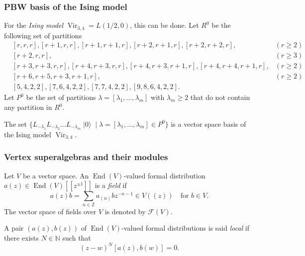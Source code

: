 \documentclass{beamer}
\DeclareMathOperator{\Vir}{Vir}
\DeclareMathOperator{\End}{End}
\DeclareMathOperator{\vac}{|0\rangle}
\begin{document}
\begin{frame}
  \frametitle{PBW basis of the Ising model}

  For the \emph{Ising model} $\Vir_{3, 4} = L(1/2, 0)$, this can be done.
  Let $R^0$ be the following set of partitions
  \footnotesize
  \begin{align*}
    &[r, r, r], [r + 1, r, r], [r + 1, r + 1, r], [r + 2, r + 1, r], [r + 2, r + 2, r], &(r \ge 2) \\
    &[r + 2, r, r], &(r \ge 3) \\
    &[r + 3, r + 3, r, r], [r + 4, r + 3, r, r],  [r + 4, r + 3, r + 1, r], [r + 4, r + 4, r + 1, r], &(r \ge 2) \\
    &[r + 6, r + 5, r + 3, r + 1, r], &(r \ge 2) \\
    &[5, 4, 2, 2], [7, 6, 4, 2, 2], [7, 7, 4, 2, 2], [9, 8, 6, 4, 2, 2].
  \end{align*}
  \normalsize
  Let $P^0$ be the set of partitions $\lambda = [\lambda_1, \dots, \lambda_m]$ with $\lambda_m \ge 2$ that do not contain any partition in $R^0$.

  \begin{theorem}
    \label{thr:2}
    The set $\{L_{-\lambda_1}L_{-\lambda_2}\dots L_{-\lambda_m}\vac \mid \lambda = [\lambda_1, \dots, \lambda_m] \in P^0\}$ is a vector space basis of the Ising model $\Vir_{3, 4}$.
  \end{theorem}

\end{frame}

\begin{frame}
  \frametitle{Vertex superalgebras and their modules}

  Let $V$ be a vector space.
  An $\End(V)$-valued formal distribution $a(z) \in \End(V)[[z^{\pm 1}]]$ is a \emph{field} if
  \begin{equation*}
    a(z)b = \sum_{n \in \mathbb{Z}}a_{(n)}bz^{-n - 1} \in V((z)) \quad \text{for $b \in V$}.
  \end{equation*}
  The vector space of fields over $V$ is denoted by $\mathcal{F}(V)$.

  A pair $(a(z), b(z))$ of $\End(V)$-valued formal distributions is said \emph{local} if there exists $N \in \mathbb{N}$ such that
  \begin{equation*}
    (z - w)^N[a(z), b(w)] = 0.
  \end{equation*}

\end{frame}
\end{document}
